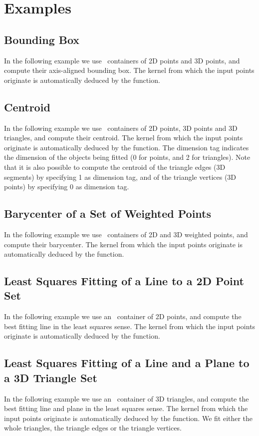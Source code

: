 \section{Examples\label{subsec:pca_examples}}

\subsection{Bounding Box}
In the following example we use \stl\ containers of 2D points and 3D points, and compute their axis-aligned bounding box. The kernel from which the input points originate is automatically deduced by the function.

\subsection{Centroid}
In the following example we use \stl\ containers of 2D points, 3D points and 3D triangles, and compute their centroid. The kernel from which the input points originate is automatically deduced by the function. The dimension tag indicates the dimension of the objects being fitted (0 for points, and 2 for triangles). Note that it is also possible to compute the centroid of the triangle edges (3D segments) by specifying 1 as dimension tag, and of the triangle vertices (3D points) by specifying 0 as dimension tag.

\subsection{Barycenter of a Set of Weighted Points}
In the following example we use \stl\ containers of 2D and 3D weighted points, and compute their barycenter. The kernel from which the input points originate is automatically deduced by the function.

\subsection{Least Squares Fitting of a Line to a 2D Point Set}
In the following example we use an \stl\ container of 2D points, and compute the best fitting line in the least squares sense. The kernel from which the input points originate is automatically deduced by the function.

\subsection{Least Squares Fitting of a Line and a Plane to a 3D Triangle Set}
In the following example we use an \stl\ container of 3D triangles, and compute the best fitting line and plane in the least squares sense. The kernel from which the input points originate is automatically deduced by the function. We fit either the whole triangles, the triangle edges or the triangle vertices.


